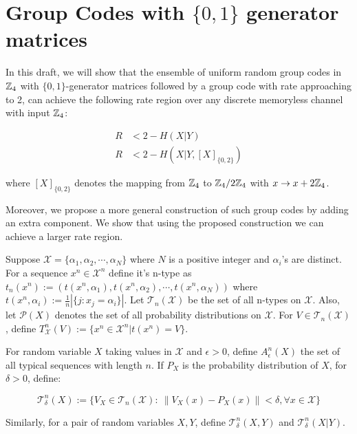 


\section{Group Codes with $\{ 0,1\}$ generator matrices}\label{sec: group codes with 0,1 gen mtx}
In this draft, we will show that the ensemble of uniform random group codes in $\mathbb{Z}_4$ with $\{ 0,1\}$-generator matrices followed by a group code with rate approaching to 2, can achieve the following rate region over any discrete memoryless channel with input $\mathbb{Z}_4$:

\begin{align*}
R&<2-H(X|Y)\\
R&< 2-H(X|Y,[X]_{\{ 0,2\}})
\end{align*}

where $[X]_{\{ 0,2\}}$ denotes the mapping from $\mathbb{Z}_4$ to $\mathbb{Z}_4/2\mathbb{Z}_4$ with $x\rightarrow x+2\mathbb{Z}_4$. 

Moreover, we propose a more general construction of such group codes by adding an extra component. We show that using the proposed construction we can achieve a larger rate region. 

\begin{definition}
Suppose $\mathcal{X}=\{\alpha_1,\alpha_2,\cdots, \alpha_N \}$ where $N$ is a positive integer and $\alpha_i$'s are distinct. For a sequence $x^n\in \mathcal{X}^n$ define it's n-type as $t_n(x^n):=(t(x^n,\alpha_1),t(x^n,\alpha_2),\cdots, t(x^n,\alpha_N))$ where $t(x^n,\alpha_i):= \frac{1}{n} |\{ j: x_j=\alpha_i\}|$. Let $\mathcal{T}_n(\mathcal{X})$ be the set of all n-types on $\mathcal{X}$. Also, let $\mathcal{P}(X)$ denotes the set of all probability distributions on $\mathcal{X}$. For $V\in \mathcal{T}_n(\mathcal{X})$, define $T_{\mathcal{X}}^n(V):=\{ x^n\in \mathcal{X}^n|t(x^n)=V\}$.
\end{definition}

\begin{definition}
For random variable $X$ taking values in $\mathcal{X}$ and  $\epsilon>0$, define $A_\epsilon^n(X)$ the set of all typical sequences with length $n$. If $P_X$ is the probability distribution of $X$, for $\delta>0$, define: 

\begin{equation*}
\mathcal{T}_\delta^n(X):=\{ V_X\in \mathcal{T}_n(\mathcal{X}) : ~ \|V_X(x)-P_X(x)\|<\delta, \forall x\in \mathcal{X}\} 
\end{equation*}

Similarly, for a pair of random variables $X,Y$,  define $\mathcal{T}_\delta^n(X,Y)$ and $\mathcal{T}_\delta^n(X|Y)$. 
\end{definition}

